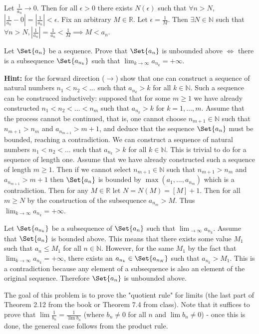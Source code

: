 \documentclass[paper=a4, fontsize=11pt]{jhwhw} %
\begin{document}
Let $\frac{1}{a_n}\to 0$. Then for all $\epsilon > 0$ there exists $N(\epsilon)$ such that $\forall n > N$, $\left|\frac{1}{a_n} - 0\right| = \left|\frac{1}{a_n}\right| < \epsilon $. Fix an arbitrary $M\in \mathbb R$. Let $\epsilon = \frac{1}{M}$. Then $\exists N\in \mathbb N$ such that $\forall n > N, \left|\frac{1}{a_n}\right| = \frac{1}{a_n} < \frac{1}{M} \implies M < a_n$. 

Let $\Set{a_n}$ be a sequence. Prove that $\Set{a_n}$ is unbounded above $\iff$ there is a subsequence $\Set{a_{n_k}}$ such that $\lim_{k\to\infty}a_{n_k} = +\infty$. 

    \textbf{Hint:} for the forward direction ($\to$) show that one can construct a sequence of natural numbers $n_1 < n_2 < \ldots$ such that $a_{n_k} > k$ for all $k\in \mathbb N$. Such a sequence can be construced inductively: supposed that for some $m \ge 1$ we have already constructed $n_1 < n_2 < \ldots < n_m$ such that $a_{n_k} > k$ for $k = 1,\ldots, m$. Assume that the process cannot be continued, that is, one cannot choose $n_{m+1}\in \mathbb N$ such that $n_{m+1} > n_m$ and $a_{n_{m+1}} > m + 1$, and deduce that the sequence $\Set{a_n}$ must be bounded, reaching a contradiction.
\solution
We can construct a sequence of natural numbers $n_1 < n_2 < \ldots$ such that $a_{n_k} > k$ for all $k\in \mathbb N$. This is trivial to do for a sequence of length one. Assume that we have already constructed such a sequence of length $m\ge 1$. Then if we cannot select $n_{m+1} \in \mathbb N$ such that $n_{m+1} > n_m$ and $a_{n_{m+1}} > m + 1$ then $\Set{a_n}$ is bounded by $\max(a_1, \ldots, a_{n_m})$ which is a contradiction. Then for any $M\in \mathbb R$ let $N = N(M) = [M] + 1$. Then for all $m \ge N$ by the construction of the subsequence $a_{n_m} > M$. Thus $\lim_{k\to\infty}a_{n_k} = +\infty$.

Let $\Set{a_{n_k}}$ be a subsequence of $\Set{a_n}$ such that $\lim_{\to\infty}a_{n_k}$. Assume that $\Set{a_n}$ is bounded above. This means that there exists some value $M_1$ such that $a_n \le M_1$ for all $n\in \mathbb N$. However, for the same $M_1$ by the fact that $\lim_{k\to\infty}a_{n_k} = +\infty$, there exists an $a_{n_k} \in \Set{a_{n_K}}$ such that $a_{n_k} > M_1$. This is a contradiction because any element of a subsequence is also an element of the original sequence. Therefore $\Set{a_n}$ is unbounded above.

The goal of this problem is to prove the "quotient rule" for limits (the last part of Theorem 2.12 from the book or Theorem 7.4 from class). Note that it suffices to prove that $\lim\frac{1}{b_n} = \frac{1}{\lim b_n}$ (where $b_n \not= 0$ for all $n$ and $\lim b_n \not= 0$) - once this is done, the genereal case follows from the product rule. 
\end{document}

